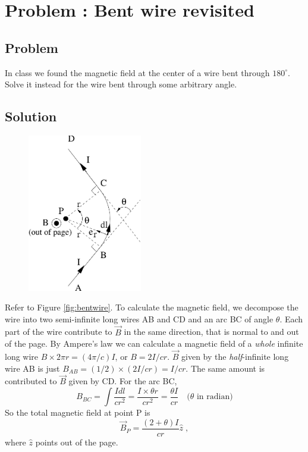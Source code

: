 \documentclass[solutions]{esg8022pset}
\begin{document}
\section{Problem \thesection: Bent wire revisited}
\subsection{Problem}
In class we found the magnetic field at the center of a wire bent through $180^\circ$.
Solve it instead for the wire bent through some arbitrary angle.
\subsection{Solution}


   \begin{figure}[ht]
    \centering
    \includegraphics[width = 5cm]{BS1v05}
    \label{fig:bentwire}
  \end{figure}

Refer to Figure \autoref{fig:bentwire}.  To calculate the magnetic
field, we decompose the wire into two semi-infinite long wires AB and
CD and an arc BC of angle $\theta$.  Each part of the wire contribute to $\vec{B}$ in
the same direction, that is normal to and out of the page.  By Ampere's law we
can calculate a magnetic field of a {\sl whole} infinite long wire
$B\times 2\pi r=(4\pi/c)I$, or $B=2I/cr$.   $\vec{B}$ given by the
{\sl half}-infinite long wire AB is just $B_{AB}=(1/2)\times
(2I/cr)=I/cr$.  The same amount is contributed to $\vec{B}$ given by
CD.  For the arc BC,
\begin{equation}
B_{BC}=\int\frac{Idl}{cr^2}=\frac{I\times \theta r}{cr^2}=\frac{\theta I}{cr}\quad\textrm{($\theta$ in radian)}
\end{equation}
So the total magnetic field at point P is
\begin{equation}
\vec B_P=\frac{(2+\theta)I}{cr}\hat z\;,
\end{equation}
where $\hat z$ points out of the page.
\end{document}
